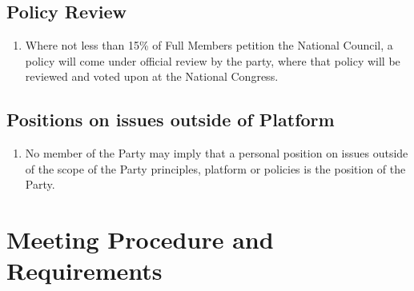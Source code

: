 \documentclass[a4paper,titlepage,8.5pt]{article}
\begin{document}
\subsection{Policy Review}

\begin{enumerate}
\item Where not less than 15\% of Full Members petition the National Council, a policy will come under official review by the party, where that policy will be reviewed and voted upon at the National Congress.
\end{enumerate}

\subsection{Positions on issues outside of Platform}

\begin{enumerate}
\item No member of the Party may imply that a personal position on issues outside of the scope of the Party principles, platform or policies is the position of the Party.
\end{enumerate}

\section{Meeting Procedure and Requirements}
\end{document}
